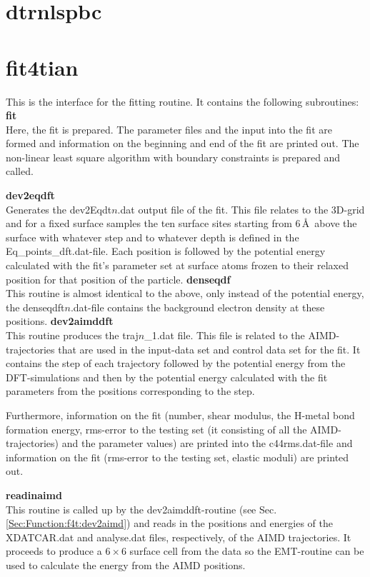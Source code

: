 \documentclass[twoside, 11pt, titlepage, captions=nooneline, a4paper, headsepline]{scrbook}%
\newcommand{\9}{\mathrm}
\newcommand{\0}{\,\mathrm}
\begin{document}
\section{dtrnlspbc}
\section{fit4tian}
This is the interface for the fitting routine. It contains the following subroutines:
\textbf{fit}\\
Here, the fit is prepared. The parameter files and the input into the fit are formed and information on the beginning and end of the fit are printed out. The non-linear least square algorithm with boundary constraints is prepared and called.
 
\textbf{dev2eqdft}\\
Generates the dev2Eqdt$n$.dat output file of the fit. This file relates to the 3D-grid and for a fixed surface samples the ten surface sites starting from 6\,\AA~above the surface with whatever step and to whatever depth is defined in the Eq\_points\_dft.dat-file. Each position is followed by the potential energy calculated with the fit's parameter set at surface atoms frozen to their relaxed position for that position of the particle.
\textbf{denseqdf}\\
This routine is almost identical to the above, only instead of the potential energy, the denseqdft$n$.dat-file contains the background electron density at these positions.
\textbf{dev2aimddft}\\
\label{Sec:Function:f4t:dev2aimd}
This routine produces the traj$n$\_1.dat file. This file is related to the AIMD-trajectories that are used in the input-data set and control data set for the fit. It contains the step of each trajectory followed by the potential energy from the DFT-simulations and then by the potential energy calculated with the fit parameters from the positions corresponding to the step.

Furthermore, information on the fit (number, shear modulus, the H-metal bond formation energy, rms-error to the testing set (it consisting of all the AIMD-trajectories) and the parameter values) are printed into the c44rms.dat-file and information on the fit (rms-error to the testing set, elastic moduli) are printed out.

\textbf{readinaimd}\\
This routine is called up by the dev2aimddft-routine (see Sec.\,\ref{Sec:Function:f4t:dev2aimd}) and reads in the positions and energies of the XDATCAR.dat and analyse.dat files, respectively, of the AIMD trajectories. It proceeds to produce a $6\times6$ surface cell from the data so the EMT-routine can be used to calculate the energy from the AIMD positions.
\end{document}
